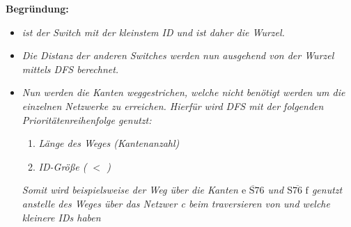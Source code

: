 \documentclass[a4paper]{article}
\begin{document}
\textbf{Begründung:}
\begin{itemize}
    \item \textit{ ist der Switch mit der kleinstem ID und ist daher die Wurzel.}
    \item \textit{Die Distanz der anderen Switches werden nun ausgehend von der Wurzel mittels DFS berechnet.}
    \item \textit{Nun werden die Kanten weggestrichen, welche nicht benötigt werden um die einzelnen Netzwerke zu erreichen. Hierfür wird DFS mit der folgenden Prioritätenreihenfolge genutzt:}
    \begin{enumerate}
        \item \textit{Länge des Weges (Kantenanzahl)}
        \item \textit{ID-Größe ( $<$ )}
    \end{enumerate}
    \textit{Somit wird beispielsweise der Weg über die Kanten $\overline{\text{e S76}}$ und $\overline{\text{S76 f}}$ genutzt anstelle des Weges über das Netzwer c beim traversieren von  und  welche kleinere IDs haben}
\end{itemize}
\clearpage
\end{document}
